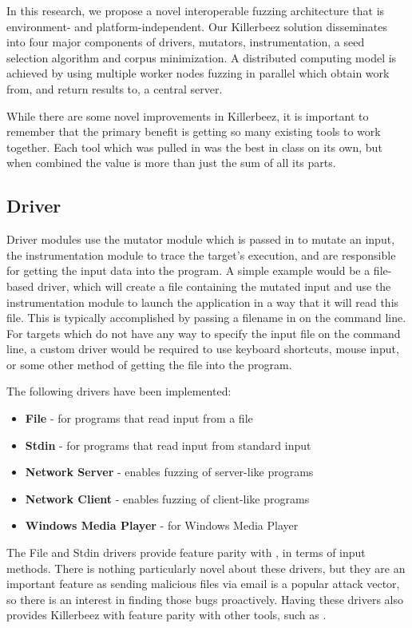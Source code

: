 In this research, we propose a novel interoperable fuzzing architecture that is
environment- and platform-independent. Our Killerbeez solution disseminates
into four major components of drivers, mutators, instrumentation, a seed
selection algorithm and corpus minimization. A distributed computing model is
achieved by using multiple worker nodes fuzzing in parallel which obtain work
from, and return results to, a central server.

While there are some novel improvements in Killerbeez, it is important to
remember that the primary benefit is getting so many existing tools to work
together.  Each tool which was pulled in was the best in class on its own, but
when combined the value is more than just the sum of all its parts.

\subsection{Driver} \label{Driver}
Driver modules use the mutator module which is passed in to mutate an input,
the instrumentation module to trace the target's execution, and are responsible
for getting the input data into the program.  A simple example would be a
file-based driver, which will create a file containing the mutated input and
use the instrumentation module to launch the application in a way that it will
read this file.  This is typically accomplished by passing a filename in on the
command line.  For targets which do not have any way to specify the input file
on the command line, a custom driver would be required to use keyboard
shortcuts, mouse input, or some other method of getting the file into the
program.

The following drivers have been implemented:
\begin{itemize}[noitemsep]
\item \textbf{File} - for programs that read input from a file
\item \textbf{Stdin} - for programs that read input from standard input
\item \textbf{Network Server} - enables fuzzing of server-like programs
\item \textbf{Network Client} - enables fuzzing of client-like programs
\item \textbf{Windows Media Player} - for Windows Media Player
\end{itemize}

The File and Stdin drivers provide feature parity with \AFL{}, in terms of input
methods. There is nothing particularly novel about these drivers, but they are
an important feature as sending malicious files via email is a popular attack
vector, so there is an interest in finding those bugs proactively. Having these
drivers also provides Killerbeez with feature parity with other tools, such as
\AFL{}.


